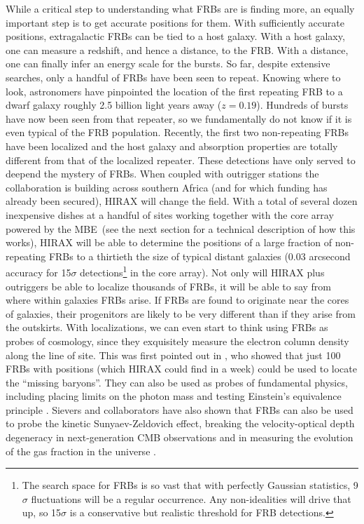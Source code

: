 \documentclass[11pt]{article}
\newcommand{\mbe}{{\rm MBE}}
\begin{document}
While a critical step to understanding what FRBs are is finding more,
an equally important step is to get accurate positions for them.  With
sufficiently accurate positions, extragalactic FRBs can be tied to a
host galaxy.  With a host galaxy, one can measure a redshift, and hence
a distance, to the FRB.  With a distance, one can finally infer an
energy scale for the bursts.  So far, despite extensive searches, only
a handful of FRBs have been seen to repeat.  Knowing where to look, astronomers
have pinpointed the location of the first repeating FRB to a dwarf
galaxy roughly 2.5 billion light years away ($z=0.19$).  Hundreds of
bursts have now been seen from that repeater, so we fundamentally do
not know if it is even typical of the FRB population.  Recently, the
first two non-repeating FRBs have been localized
\citep{Bannister2019,Ravi2019} and the host galaxy and absorption
properties are totally different from that of the localized repeater.
These detections have only served to deepend the mystery of FRBs.
 When coupled with outrigger stations the collaboration is building across southern
Africa (and for which funding has already been secured), HIRAX will
change the field.  With a total of several dozen inexpensive dishes at
a handful of sites working together with the core array powered by the
\mbe\ (see the next section for a technical description of how this
works), 
HIRAX will be able to determine the positions of a large
fraction of non-repeating FRBs to a thirtieth the size of typical
distant galaxies (0.03 arcsecond accuracy for 15$\sigma$
detections\footnote{The search space for FRBs is so vast that with
  perfectly Gaussian statistics, 9$\sigma$ fluctuations will be a
  regular occurrence.  Any non-idealities will drive that up, so
  15$\sigma$ is a conservative but realistic threshold for FRB
  detections.} in the core array).  
Not only will HIRAX plus
outriggers be able to localize thousands of FRBs, it will be able to
say from where within galaxies FRBs arise.  If FRBs are found to
originate near the cores of galaxies, their progenitors are likely to
be very different than if they arise from the outskirts.  With
localizations, we can even start to think using FRBs as probes of
cosmology, since they exquisitely measure the electron column density
along the line of site. This was first pointed out in
\citet{McQuinn2014}, who showed that just 100 FRBs with positions
(which HIRAX could find in a week) could be used to locate the
``missing baryons''.  They can also be used as probes of fundamental
physics, including placing limits on the photon mass
\citep{bonetti2017} and testing Einstein's equivalence principle
\citep{frb_equivalence}.  Sievers and collaborators have also shown
that FRBs can also be used to probe the kinetic Sunyaev-Zeldovich
effect, breaking the velocity-optical depth degeneracy in
next-generation CMB observations \citep{Madhavacheril18} and in
measuring the evolution of the gas fraction in the universe
\citep{Walters2019}.  
\end{document}
